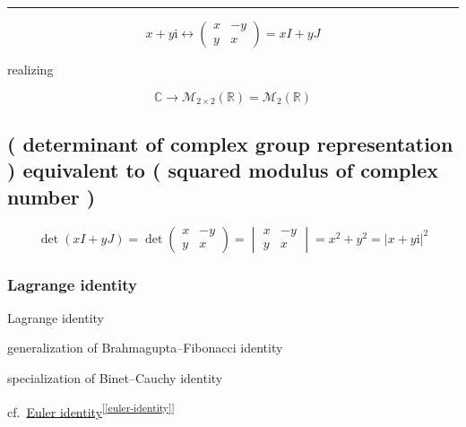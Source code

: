 \documentclass[
]{book}
\theoremstyle{definition}
\theoremstyle{definition}
\theoremstyle{definition}
\theoremstyle{definition}
\theoremstyle{remark}
\begin{document}
\begin{center}\rule{0.5\linewidth}{0.5pt}\end{center}

\[
x+y\mathrm{i}\leftrightarrow\begin{pmatrix}x & -y\\
y & x
\end{pmatrix}=xI+yJ
\]

realizing

\[
\mathbb{C}\rightarrow\mathcal{M}_{2\times2}\left(\mathbb{R}\right)=\mathcal{M}_{2}\left(\mathbb{R}\right)
\]

\subsection{( determinant of complex group representation ) equivalent to ( squared modulus of complex number )}\label{determinant-of-complex-group-representation-equivalent-to-squared-modulus-of-complex-number}

\[
\det\left(xI+yJ\right)=\det\begin{pmatrix}x & -y\\
y & x
\end{pmatrix}=\begin{vmatrix}x & -y\\
y & x
\end{vmatrix}=x^{2}+y^{2}=\left|x+y\mathrm{i}\right|^{2}
\]

\subsubsection{Lagrange identity}\label{lagrange-identity}

Lagrange identity

generalization of Brahmagupta--Fibonacci identity

specialization of Binet--Cauchy identity

cf.~\hyperref[euler-identity]{Euler identity}\textsuperscript{{[}\ref{euler-identity}{]}}
\end{document}
